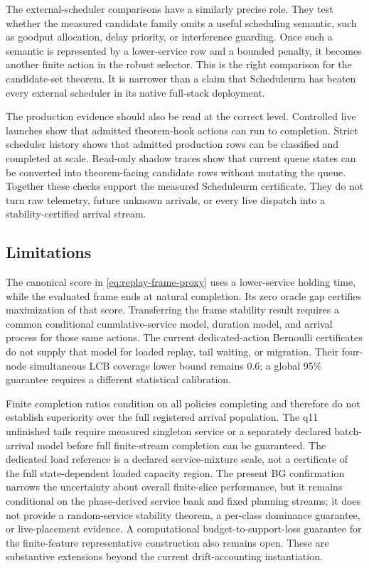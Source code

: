 \documentclass[opre,dblanonrev]{informs4}
\begin{document}
The external-scheduler comparisons have a similarly precise role.  They test
whether the measured candidate family omits a useful scheduling semantic, such
as goodput allocation, delay priority, or interference guarding.  Once such a
semantic is represented by a lower-service row and a bounded penalty, it becomes
another finite action in the robust selector.  This is the right comparison for
the candidate-set theorem.  It is narrower than a claim that Scheduleurm has
beaten every external scheduler in its native full-stack deployment.

The production evidence should also be read at the correct level.  Controlled
live launches show that admitted theorem-hook actions can run to completion.
Strict scheduler history shows that admitted production rows can be classified
and completed at scale.  Read-only shadow traces show that current queue states
can be converted into theorem-facing candidate rows without mutating the queue.
Together these checks support the measured Scheduleurm certificate.  They do
not turn raw telemetry, future unknown arrivals, or every live dispatch into a
stability-certified arrival stream.

\subsection{Limitations}
The canonical score in \eqref{eq:replay-frame-proxy} uses a lower-service holding
time, while the evaluated frame ends at natural completion.  Its zero oracle
gap certifies maximization of that score.  Transferring the frame stability
result requires a common conditional cumulative-service model, duration model,
and arrival process for those same actions.  The current dedicated-action
Bernoulli certificates do not supply that model for loaded replay, tail waiting,
or migration.  Their four-node simultaneous LCB coverage lower bound remains
0.6; a global 95\% guarantee requires a different statistical calibration.

Finite completion ratios condition on all policies completing and therefore do
not establish superiority over the full registered arrival population.  The
q11 unfinished tails require measured singleton service or a separately declared
batch-arrival model before full finite-stream completion can be guaranteed.
The dedicated load reference is a declared service-mixture scale, not a
certificate of the full state-dependent loaded capacity region.  The present
BG confirmation narrows the uncertainty about overall finite-slice performance,
but it remains conditional on the phase-derived service bank and fixed planning
streams; it does not provide a random-service stability theorem, a per-class
dominance guarantee, or live-placement evidence.  A computational
budget-to-support-loss guarantee for the finite-feature representative
construction also remains open.  These are substantive extensions beyond the
current drift-accounting instantiation.
\end{document}
